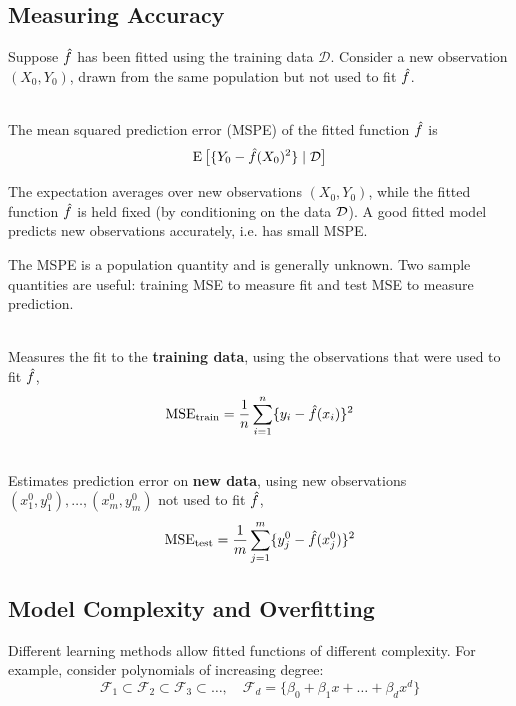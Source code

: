 \subsection{Measuring Accuracy}


Suppose $\hat{f}$ has been fitted using the training data $\mathcal{D}$. Consider a new observation $(X_0,Y_0)$, drawn from the same population but not used to fit $\hat{f}$.

\begin{definition}\leavevmode \\
The mean squared prediction error (MSPE) of the fitted function $\hat{f}$ is
\begin{equation*}
    \operatorname{E}\big[\{Y_0-\hat{f}(X_0)^2\} \mid \mathcal{D} \big]
\end{equation*}
\end{definition}

The expectation averages over new observations $(X_0,Y_0)$, while the fitted function $\hat{f}$ is held fixed (by conditioning on the data $\mathcal{D}$). A good fitted model predicts new observations accurately, i.e. has small MSPE.

The MSPE is a population quantity and is generally unknown. Two sample quantities are useful: training MSE to measure fit and test MSE to measure prediction.
\begin{definition} \leavevmode \\
Measures the fit to the \textbf{training data}, using the observations that were used to fit $\hat{f}$,
\begin{equation*}
     \text{MSE}_\text{train}=\frac{1}{n}\sum_{i=1}^{n}\{y_i-\hat{f}(x_i)\}^2
\end{equation*}
\end{definition}

\begin{definition} \leavevmode \\
Estimates prediction error on \textbf{new data}, using new observations $(x_1^0,y_1^0),\dots,(x_m^0,y_m^0)$ not used to fit $\hat{f}$,
\begin{equation*}
     \text{MSE}_\text{test}=\frac{1}{m}\sum_{j=1}^{m}\{y_j^0-\hat{f}(x_j^0)\}^2
\end{equation*}
\end{definition}

\subsection{Model Complexity and Overfitting}
Different learning methods allow fitted functions of different complexity. For example, consider polynomials of increasing degree:
\begin{equation*}
    \mathcal{F}_1\subset \mathcal{F}_2\subset \mathcal{F}_3\subset\dots, \quad \mathcal{F}_d=\{\beta_0+\beta_1x+\dots+\beta_dx^d\}
\end{equation*}

